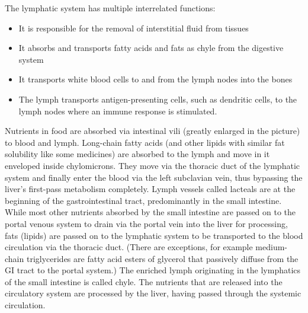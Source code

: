 The lymphatic system has multiple interrelated functions:

\begin{itemize}
\tightlist
\item
  It is responsible for the removal of interstitial fluid from tissues
\item
  It absorbs and transports fatty acids and fats as chyle from the digestive system
\item
  It transports white blood cells to and from the lymph nodes into the bones
\item
  The lymph transports antigen-presenting cells, such as dendritic cells, to the lymph nodes where an immune response is stimulated.
\end{itemize}

Nutrients in food are absorbed via intestinal vili (greatly enlarged in the picture) to blood and lymph. Long-chain fatty acids (and other lipids with similar fat solubility like some medicines) are absorbed to the lymph and move in it enveloped inside chylomicrons. They move via the thoracic duct of the lymphatic system and finally enter the blood via the left subclavian vein, thus bypassing the liver's first-pass metabolism completely.
Lymph vessels called lacteals are at the beginning of the gastrointestinal tract, predominantly in the small intestine. While most other nutrients absorbed by the small intestine are passed on to the portal venous system to drain via the portal vein into the liver for processing, fats (lipids) are passed on to the lymphatic system to be transported to the blood circulation via the thoracic duct. (There are exceptions, for example medium-chain triglycerides are fatty acid esters of glycerol that passively diffuse from the GI tract to the portal system.) The enriched lymph originating in the lymphatics of the small intestine is called chyle. The nutrients that are released into the circulatory system are processed by the liver, having passed through the systemic circulation.



